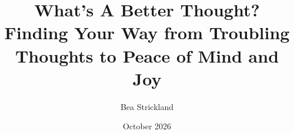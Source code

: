


\makeatletter
{}
\makeatother
\title{What's A Better Thought? \\[0.4em] \large Finding Your Way from Troubling Thoughts to Peace of Mind and Joy}
\author{Bea Strickland}
\date{October 2026}



\frontmatter

\maketitle


